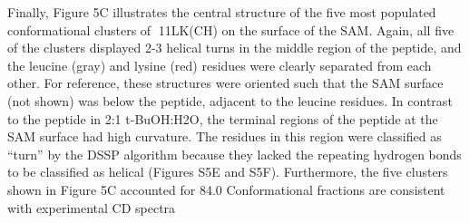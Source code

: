 Finally, Figure 5C illustrates the central structure of the five most populated conformational clusters of 11LK(CH) on the surface of the SAM. Again, all five of the clusters displayed 2-3 helical turns in the middle region of the peptide, and the leucine (gray) and lysine (red) residues were clearly separated from each other. For reference, these structures were oriented such that the SAM surface (not shown) was below the peptide, adjacent to the leucine residues. In contrast to the peptide in 2:1 t-BuOH:H2O, the terminal regions of the peptide at the SAM surface had high curvature. The residues in this region were classified as “turn” by the DSSP algorithm because they lacked the repeating hydrogen bonds to be classified as helical (Figures S5E and S5F). Furthermore, the five clusters shown in Figure 5C accounted for 84.0%
Conformational fractions are consistent with experimental CD spectra
